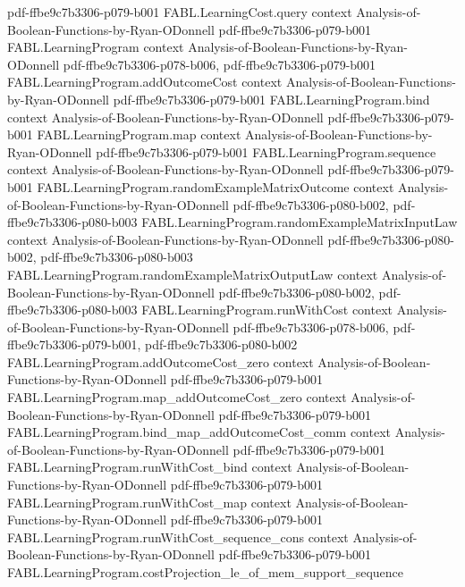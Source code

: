 \begin{theorem}
  {pdf-ffbe9c7b3306-p079-b001}
\proofstep
  {FABL.LearningCost.query}
  {context}
  {Analysis-of-Boolean-Functions-by-Ryan-ODonnell}
  {pdf-ffbe9c7b3306-p079-b001}
\proofstep
  {FABL.LearningProgram}
  {context}
  {Analysis-of-Boolean-Functions-by-Ryan-ODonnell}
  {pdf-ffbe9c7b3306-p078-b006,
    pdf-ffbe9c7b3306-p079-b001}
\proofstep
  {FABL.LearningProgram.addOutcomeCost}
  {context}
  {Analysis-of-Boolean-Functions-by-Ryan-ODonnell}
  {pdf-ffbe9c7b3306-p079-b001}
\proofstep
  {FABL.LearningProgram.bind}
  {context}
  {Analysis-of-Boolean-Functions-by-Ryan-ODonnell}
  {pdf-ffbe9c7b3306-p079-b001}
\proofstep
  {FABL.LearningProgram.map}
  {context}
  {Analysis-of-Boolean-Functions-by-Ryan-ODonnell}
  {pdf-ffbe9c7b3306-p079-b001}
\proofstep
  {FABL.LearningProgram.sequence}
  {context}
  {Analysis-of-Boolean-Functions-by-Ryan-ODonnell}
  {pdf-ffbe9c7b3306-p079-b001}
\proofstep
  {FABL.LearningProgram.randomExampleMatrixOutcome}
  {context}
  {Analysis-of-Boolean-Functions-by-Ryan-ODonnell}
  {pdf-ffbe9c7b3306-p080-b002,
    pdf-ffbe9c7b3306-p080-b003}
\proofstep
  {FABL.LearningProgram.randomExampleMatrixInputLaw}
  {context}
  {Analysis-of-Boolean-Functions-by-Ryan-ODonnell}
  {pdf-ffbe9c7b3306-p080-b002,
    pdf-ffbe9c7b3306-p080-b003}
\proofstep
  {FABL.LearningProgram.randomExampleMatrixOutputLaw}
  {context}
  {Analysis-of-Boolean-Functions-by-Ryan-ODonnell}
  {pdf-ffbe9c7b3306-p080-b002,
    pdf-ffbe9c7b3306-p080-b003}
\proofstep
  {FABL.LearningProgram.runWithCost}
  {context}
  {Analysis-of-Boolean-Functions-by-Ryan-ODonnell}
  {pdf-ffbe9c7b3306-p078-b006,
    pdf-ffbe9c7b3306-p079-b001,
    pdf-ffbe9c7b3306-p080-b002}
\proofstep
  {FABL.LearningProgram.addOutcomeCost_zero}
  {context}
  {Analysis-of-Boolean-Functions-by-Ryan-ODonnell}
  {pdf-ffbe9c7b3306-p079-b001}
\proofstep
  {FABL.LearningProgram.map_addOutcomeCost_zero}
  {context}
  {Analysis-of-Boolean-Functions-by-Ryan-ODonnell}
  {pdf-ffbe9c7b3306-p079-b001}
\proofstep
  {FABL.LearningProgram.bind_map_addOutcomeCost_comm}
  {context}
  {Analysis-of-Boolean-Functions-by-Ryan-ODonnell}
  {pdf-ffbe9c7b3306-p079-b001}
\proofstep
  {FABL.LearningProgram.runWithCost_bind}
  {context}
  {Analysis-of-Boolean-Functions-by-Ryan-ODonnell}
  {pdf-ffbe9c7b3306-p079-b001}
\proofstep
  {FABL.LearningProgram.runWithCost_map}
  {context}
  {Analysis-of-Boolean-Functions-by-Ryan-ODonnell}
  {pdf-ffbe9c7b3306-p079-b001}
\proofstep
  {FABL.LearningProgram.runWithCost_sequence_cons}
  {context}
  {Analysis-of-Boolean-Functions-by-Ryan-ODonnell}
  {pdf-ffbe9c7b3306-p079-b001}
\proofstep
  {FABL.LearningProgram.costProjection_le_of_mem_support_sequence}

\end{theorem}

